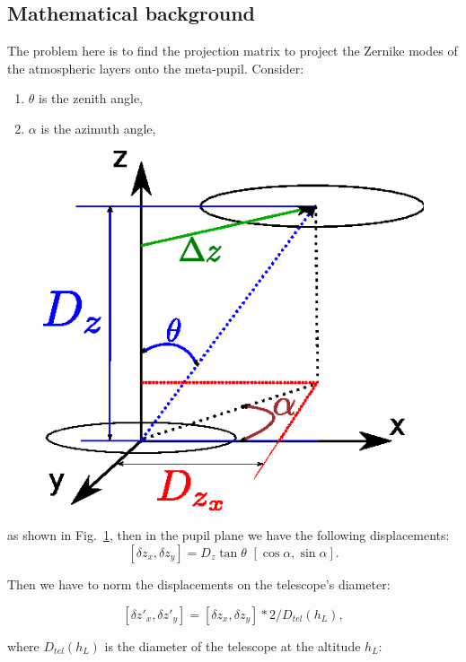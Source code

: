 \documentclass[a4paper,12pt]{article}
\begin{document}
\subsection{Mathematical background}
The problem here is to find the projection matrix to project the Zernike modes of the atmospheric layers onto the meta-pupil. Consider:
\begin{enumerate}
 \item  $\theta$ is the  zenith angle,
 \item  $\alpha$ is the azimuth angle,
\end{enumerate}

\begin{figure} 
\vspace{-12ex}
\includegraphics[width=1\linewidth]{layer_above_and_below}
\label{fig:layer_above_and_below}
\end{figure} as shown in Fig.~\ref{fig:layer_above_and_below}, then in the pupil plane we have the following displacements: 
$$[\delta z_x, \delta z_y] = D_z \tan \theta \,\, [\cos \alpha, \sin \alpha ].$$

Then we have to norm the displacements on the telescope's diameter: 

$$[\delta z'_x, \delta z'_y] = [\delta z_x, \delta z_y] *2 / D_{tel}(h_L),$$

 where $D_{tel}(h_L)$ is the diameter of the telescope at the altitude $h_L$:
\end{document}
